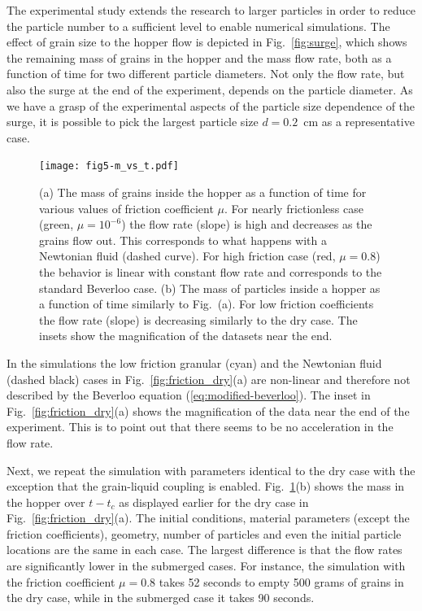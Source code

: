 \documentclass[twoside,twocolumn,9pt]{article}
\begin{document}
The experimental study extends the research to larger particles in order
to reduce the particle number to a sufficient level to enable numerical 
simulations. 
The effect of grain size to the hopper flow is depicted in 
Fig.~\ref{fig:surge}, which shows the remaining mass of grains in the hopper
and the mass flow rate, both as a function of time for two different 
particle diameters. 
Not only the flow rate, but also the surge at the end of the experiment, 
depends on the particle diameter. As we have a grasp of the experimental 
aspects of the particle size dependence of the surge, it is possible to 
pick the largest particle size $d=0.2$~cm as a representative case.
 
\begin{figure}[!t] 
 \texttt{[image: fig5-m\_vs\_t.pdf]}
\caption{(a) The mass of grains inside the hopper as a function of time for various values of friction coefficient $\mu$. For nearly frictionless case (green, $\mu=10^{-6}$) the flow rate (slope) is high and decreases as the grains flow out. This corresponds to what happens with a Newtonian fluid (dashed curve). For high friction case (red, $\mu=0.8$) the behavior is linear with constant flow rate and corresponds to the standard Beverloo case. (b) The mass of particles inside a hopper as a function of time similarly to Fig.~(a). For low friction coefficients the flow rate (slope) is decreasing similarly to the dry case. The insets show the magnification of the datasets near the end. }
 \label{fig:friction_dry} \label{fig:friction_sub}
\end{figure}
%
%
In the simulations the low friction granular (cyan) and the Newtonian fluid (dashed black) cases in Fig.~\ref{fig:friction_dry}(a) are non-linear and therefore not described by the Beverloo equation (\ref{eq:modified-beverloo}). 
The inset in Fig.~\ref{fig:friction_dry}(a) shows the magnification of the data near the end of the experiment. This is to point out that there seems to be no acceleration in the flow rate. %

Next, we repeat the simulation with parameters identical to the dry case with the exception that the grain-liquid coupling is enabled. Fig.~\ref{fig:friction_sub}(b) shows the mass in the hopper over $t-t_{c}$ as displayed earlier for the dry case in Fig.~\ref{fig:friction_dry}(a). The initial conditions, material parameters (except the friction coefficients), geometry, number of particles and even the initial particle locations are the same in each case. The largest difference is that the flow rates are significantly lower in the submerged cases. For instance, the simulation with the friction coefficient $\mu=0.8$ takes 52 seconds to empty 500 grams of grains in the dry case, while in the submerged case it takes 90 seconds. 
\end{document}
